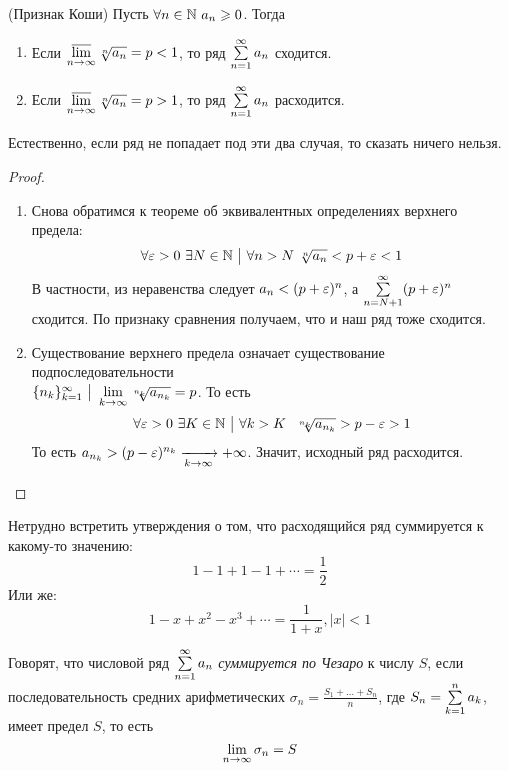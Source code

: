 \begin{theorem} (Признак Коши)
	Пусть $\forall n \in \mathbb{N}\ a_n \geqslant 0$. Тогда
	\begin{enumerate}
		\item Если $\varlimsup\limits_{n \to \infty} \sqrt[n]{a_n} = p < 1$, то ряд $\sum\limits_{n = 1}^\infty a_n$ сходится.
		
		\item Если $\varlimsup\limits_{n \to \infty} \sqrt[n]{a_n} = p > 1$, то ряд $\sum\limits_{n = 1}^\infty a_n$ расходится.
	\end{enumerate}
	Естественно, если ряд не попадает под эти два случая, то сказать ничего нельзя.
\end{theorem}

\begin{proof}~
	\begin{enumerate}
		\item Снова обратимся к теореме об эквивалентных определениях верхнего предела:
		\[
			\forall \varepsilon > 0\ \exists N \in \mathbb{N} \ \big|\  \forall n > N\ \sqrt[n]{a_n} < p + \varepsilon < 1
		\]
		В частности, из неравенства следует $a_n < (p + \varepsilon)^n$, а $\sum\limits_{n = N + 1}^\infty (p + \varepsilon)^n$ сходится. По признаку сравнения получаем, что и наш ряд тоже сходится.
		
		\item Существование верхнего предела означает существование подпоследовательности \\ $\{n_k\}_{k = 1}^\infty \ \big|\  \lim\limits_{k \to \infty} \sqrt[n_k]{a_{n_k}} = p$. То есть
		\[
			\forall \varepsilon > 0\ \exists K \in \mathbb{N} \ \big|\  \forall k > K\ \ \sqrt[n_k]{a_{n_k}} > p - \varepsilon > 1
		\]
		То есть $a_{n_k} > (p - \varepsilon)^{n_k} \xrightarrow[k \to \infty]{} +\infty$. Значит, исходный ряд расходится.
	\end{enumerate}
\end{proof}

\begin{example}
	Нетрудно встретить утверждения о том, что расходящийся ряд суммируется к какому-то значению:
	\[
		1 - 1 + 1 - 1 + \cdots = \frac{1}{2}
	\]
	Или же:
	\[
		1 - x + x^2 - x^3 + \cdots = \frac{1}{1 + x}, |x| < 1
	\]
\end{example}

\begin{definition}
	Говорят, что числовой ряд $\sum\limits_{n = 1}^\infty a_n$ \textit{суммируется по Чезаро} к числу $S$, если последовательность средних арифметических $\sigma_n = \frac{S_1 + \ldots + S_n}{n}$, где $S_n = \sum\limits_{k = 1}^n a_k$, имеет предел $S$, то есть
	\[
		\lim\limits_{n \to \infty} \sigma_n = S
	\]
\end{definition}

